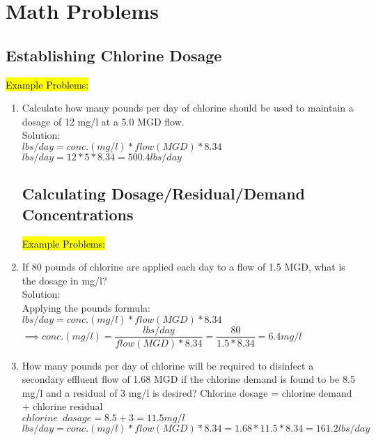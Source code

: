 \section{Math Problems}

\subsection{Establishing Chlorine Dosage}

\hl{Example Problems:}
\begin{enumerate}
\item Calculate how many pounds per day of chlorine should be used to maintain a dosage of 12 mg/l at a 5.0 MGD flow.\\
Solution:\\
$lbs/day=conc. (mg/l)*flow(MGD)*8.34$\\
$lbs/day=12*5*8.34=\boxed{500.4lbs/day}$\\

\subsection{Calculating Dosage/Residual/Demand Concentrations}

\hl{Example Problems:}
\item If 80 pounds of chlorine are applied each day to a flow of 1.5 MGD, what is the dosage in mg/l?\\
Solution:\\
Applying the pounds formula:\\  $lbs/day=conc. (mg/l)*flow(MGD)*8.34$\\
$\implies conc. (mg/l)=\dfrac{lbs/day}{flow(MGD)*8.34}=\dfrac{80}{1.5*8.34}=\boxed{6.4mg/l}$

\item How many pounds per day of chlorine will be required to disinfect a secondary effluent flow of 1.68 MGD if the chlorine demand is found to be 8.5 mg/l and a residual of 3 mg/l is desired?
Chlorine dosage = chlorine demand + chlorine residual\\
$chlorine \enspace dosage=8.5+3=11.5mg/l$\\
$lbs/day=conc. (mg/l)*flow(MGD)*8.34=1.68*11.5*8.34=\boxed{161.2lbs/day}$\\
\end{enumerate}


